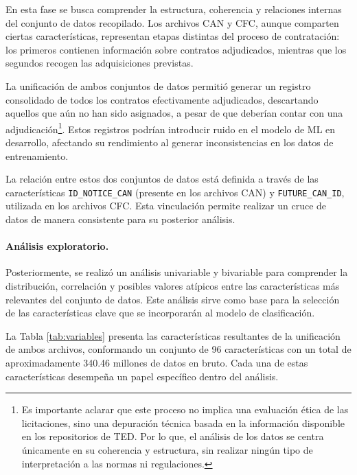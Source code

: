 \documentclass[a4paper,fleqn]{cas-sc}
\begin{document}
En esta fase se busca comprender la estructura, coherencia y relaciones internas del conjunto de datos recopilado. 
Los archivos CAN y CFC, aunque comparten ciertas características, representan etapas distintas del proceso de contratación: 
los primeros contienen información sobre contratos adjudicados, mientras que los segundos recogen las adquisiciones previstas.

La unificación de ambos conjuntos de datos permitió generar un registro consolidado de todos los contratos efectivamente adjudicados, 
descartando aquellos que aún no han sido asignados, a pesar de que deberían contar con una adjudicación\footnote{Es importante aclarar que este proceso no implica una evaluación ética de las licitaciones, sino una depuración técnica basada en la información disponible en los repositorios de TED. Por lo que, el análisis de los datos se centra únicamente en su coherencia y estructura, sin realizar ningún tipo de interpretación a las normas ni regulaciones.}. 
%
Estos registros podrían introducir ruido en el modelo de ML en desarrollo, afectando su rendimiento al generar inconsistencias en los datos de entrenamiento.

La relación entre estos dos conjuntos de datos está definida a través de las características \texttt{ID\_NOTICE\_CAN} (presente en los archivos CAN) y \texttt{FUTURE\_CAN\_ID}, utilizada en los archivos CFC. Esta vinculación permite realizar un  cruce  de datos de manera consistente para su posterior análisis.

\paragraph{\textbf{Análisis exploratorio.}}

	Posteriormente, se realizó un análisis univariable y bivariable para comprender la distribución, correlación y posibles valores atípicos entre las características más relevantes del conjunto de datos. Este análisis sirve como base para la selección de las características clave que se incorporarán al modelo de clasificación.

La Tabla \ref{tab:variables} presenta las características resultantes de la unificación de ambos archivos, conformando un conjunto de 96 características con un total de aproximadamente 340.46 millones de datos en bruto. Cada una de estas características desempeña un papel específico dentro del análisis. %
\end{document}
